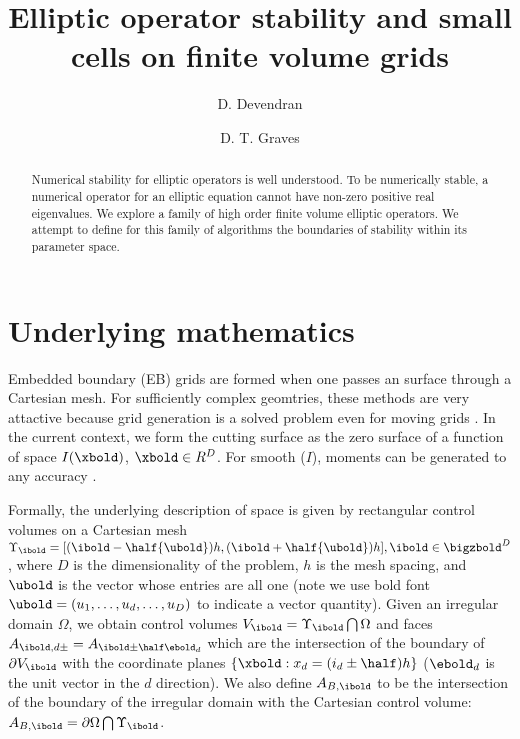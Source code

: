 \documentclass{article}
\begin{document}
\title{Elliptic operator stability and small cells on  finite volume grids}
\author{
   \and D. Devendran    \footnotemark[2]
   \and D. T. Graves    \footnotemark[1]
        }

\maketitle

\begin{abstract}

  Numerical stability for elliptic operators is well understood.  To
  be numerically stable, a numerical operator for an elliptic equation
  cannot have non-zero positive real eigenvalues.  We explore a family
  of high order finite volume elliptic operators. We attempt to
  define for this family of algorithms the boundaries of stability
  within its parameter space.
  
\end{abstract}


\section{Underlying mathematics}

Embedded boundary (EB) grids are formed when one passes an  surface
through a Cartesian mesh.    For sufficiently complex geomtries, these methods
are very attactive because grid generation is a solved problem
even for moving grids \cite{MillerTrebotich2012}.
In the current context, we form the cutting surface as the zero
surface of a function  of space $I(\xbold)$, $\xbold \in R^D$.
For smooth ($I$),  moments can be generated to any
accuracy \cite{Schwartz2015}.



Formally, the underlying description of space
is given by rectangular control volumes on a Cartesian mesh
$\Upsilon_\ibold = [(\ibold-\half {\ubold})h, (\ibold+\half
{\ubold})h], \ibold \in \bigzbold^D$, where $D$ is the dimensionality
of the problem, $h$ is the mesh spacing, and ${\ubold}$ is the vector
whose entries are all one (note we use bold font $\ubold = (u_1, \dots, u_d,
\dots, u_D)$ to indicate a vector quantity).
Given an irregular domain $\Omega$, we
obtain control volumes $V_\ibold = \Upsilon_\ibold \bigcap \Omega$ and
faces $A_{\ibold,d\pm} = A_{\ibold \pm \half \ebold_d}$ which are the
intersection of the boundary of $\partial V_\ibold$ with the
coordinate planes $\{{\xbold}:x_d = (i_d \pm \half)h \}$ ($\ebold_d$ is
the unit vector in the $d$ direction).  We also
define $A_{B,\ibold}$ to be the intersection of the boundary of the
irregular domain with the Cartesian control volume: $A_{B,\ibold}
= \partial \Omega \bigcap \Upsilon_\ibold$. 
\end{document}
